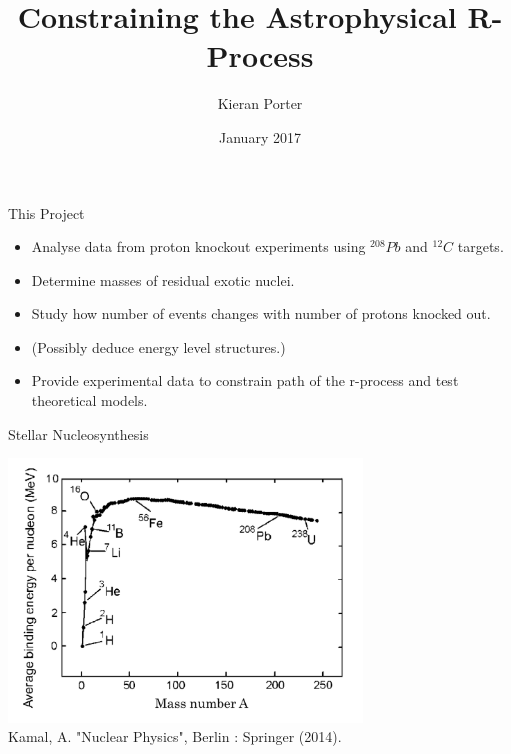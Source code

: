 \documentclass{beamer}
\title{Constraining the Astrophysical R-Process}
\author[Kieran Porter]{Kieran Porter \newline{\tiny Supervisor: Dan Watts}}
\date{January 2017}
\begin{document}
\maketitle


\begin{frame}{This Project}
\begin{itemize}
    \item Analyse data from proton knockout experiments using $^{208}Pb$ and $^{12}C$ targets.
    \item Determine masses of residual exotic nuclei.
    \item Study how number of events changes with number of protons knocked out.
    \item (Possibly deduce energy level structures.)
    \item Provide experimental data to constrain path of the r-process and test
    theoretical models.
\end{itemize}

\end{frame}



\begin{frame}{Stellar Nucleosynthesis}
    
    
        \centering
        \includegraphics[height = 7cm]{BindingEnergy}
        \\{\tiny Kamal, A. "Nuclear Physics", Berlin : Springer (2014).}
       
    
\end{frame}
\end{document}
